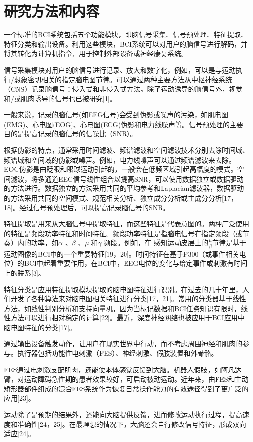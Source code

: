 \documentclass[UTF8,a4paper]{ctexart}
\begin{document}
\section{研究方法和内容}
一个标准的BCI系统包括五个功能模块，即脑信号采集、信号预处理、特征提取、特征分类和输出设备。利用这些模块，BCI系统可以对用户的脑信号进行解码，并将其转化为计算机指令，用于控制外部设备或神经康复系统。
\par
信号采集模块对用户的脑信号进行记录、放大和数字化，例如，可以是与运动执行/想象密切相关的指定脑电图节律。可以通过两种主要方法从中枢神经系统（CNS）记录脑信号：侵入式和非侵入式方法。除了运动诱导的脑信号外，视觉和/或肌肉诱导的信号也已被研究[1]。
\par
一般来说，记录的脑信号(如EEG信号)会受到伪影或噪声的污染，如肌电图(EMG)、心电图(EOG)、心电图(ECG)伪影和电力线噪声等。信号预处理的主要目的是提高记录的脑信号的信噪比（SNR）。
\par
根据伪影的特点，通常采用时间滤波、频谱滤波和空间滤波技术分别去除时间域、频谱域和空间域的伪影或噪声。例如，电力线噪声可以通过频谱滤波来去除。EOG伪影是由眨眼和眼球运动引起的，一般会在低频区域引起高幅度的模式。空间滤波，将多通道EEG信号线性组合以提高SNR，可以使用数据独立或数据驱动的方法进行。数据独立的方法采用共同的平均参考和Laplacian滤波器，数据驱动的方法采用共同的空间模式、规范相关分析、独立成分分析或主成分分析[17，18]。经过信号预处理后，可以提高记录脑信号的SNR。
\par
特征提取是用来从大脑信号中提取特征，而这些特征是代表意图的。两种广泛使用的特征是频段功率特征和时间特征。频段功率特征是指脑电信号在指定频段（或节奏）内的功率，如$\alpha$ 、$\beta$ 、$\mu$ 和$\gamma$ 频段。例如，在
感知运动皮层上的$\frac{\mu}{\beta}$节律是基于运动图像的BCI中的一个重要特征[19，20]。时间特征在基于P300（或事件相关电位）的BCI中起着重要作用，在BCI中，EEG电位的变化与给定事件或刺激有时间上的联系[3]。
\par
特征分类是应用特征提取模块提取的脑电图特征进行识别。在过去的几十年里，人们开发了各种算法来对脑电图相关特征进行分类[17，21]。常用的分类器基于线性方法，如线性判别分析和支持向量机，因为当标记数据和BCI任务知识有限时，线性方法可以进行相对稳定的计算[22]。最近，深度神经网络也被应用于BCI应用中脑电图特征的分类[17]。
\par
通过输出设备触发动作，让用户在现实世界中行动，而不考虑周围神经和肌肉的参与。执行器包括功能性电刺激（FES）、神经刺激、假肢装置和外骨骼。
\par
FES通过电刺激支配肌肉，还能使本体感觉反馈到大脑。机器人假肢，如阿凡达臂，对运动障碍急性期的患者效果较好，可启动被动运动。近年来，由FES和主动矫形器部件组成的混合FES系统作为恢复日常操作能力的有效途径得到了更广泛的应用[23]。
\par
运动除了是预期的结果外，还能向大脑提供反馈，进而修改运动执行过程，提高速度和准确性[24，25]。在最理想的情况下，大脑还会自行修改信号特征，形成双向适应[24]。
\end{document}
